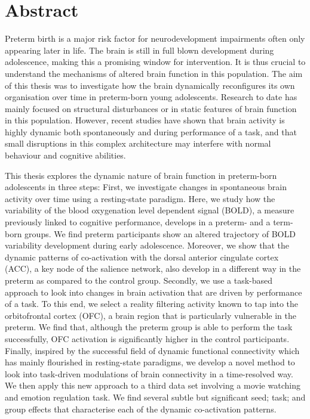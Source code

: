 

\cleardoublepage
\chapter*{Abstract}





Preterm birth is a major risk factor for neurodevelopment impairments often only appearing later in life. The brain is still in full blown development during adolescence, making this a promising window for intervention. It is thus crucial to understand the mechanisms of altered brain function in this population. The aim of this thesis was to investigate how the brain dynamically reconfigures its own organisation over time in preterm-born young adolescents. Research to date has mainly focused on structural disturbances or in static features of brain function in this population. However, recent studies have shown that brain activity is highly dynamic both spontaneously and during performance of a task, and that small disruptions in this complex architecture may interfere with normal behaviour and cognitive abilities.   


\hspace{1cm} This thesis explores the dynamic nature of brain function in preterm-born adolescents in three steps: First, we investigate changes in spontaneous brain activity over time using a resting-state paradigm. Here, we study how the variability of the blood oxygenation level dependent signal (BOLD), a measure previously linked to cognitive performance, develops in a preterm- and a term-born groups. We find preterm participants show an altered trajectory of BOLD variability development during early adolescence. Moreover, we show that the dynamic patterns of co-activation with the dorsal anterior cingulate cortex (ACC), a key node of the salience network, also develop in a different way in the preterm as compared to the control group. Secondly, we use a task-based approach to look into changes in brain activation that are driven by performance of a task. To this end, we select a reality filtering activity known to tap into the orbitofrontal cortex (OFC), a brain region that is particularly vulnerable in the preterm. We find that, although the preterm group is able to perform the task successfully, OFC activation is significantly higher in the control participants. Finally, inspired by the successful field of dynamic functional connectivity which has mainly flourished in resting-state paradigms, we develop a novel method to look into task-driven modulations of brain connectivity in a time-resolved way. We then apply this new approach to a third data set involving a movie watching and emotion regulation task. We find several subtle but significant seed; task; and group effects that characterise each of the dynamic co-activation patterns.  

